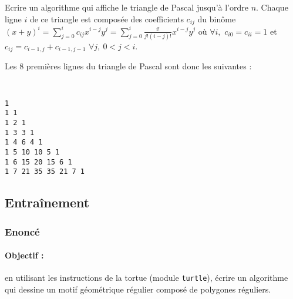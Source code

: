 \begin{question} Ecrire un algorithme qui affiche le triangle de Pascal jusqu'à l'ordre $n$. 
Chaque ligne $i$ de ce triangle est composée des coefficients $c_{ij}$ du binôme 
$\displaystyle (x + y)^i = \sum_{j=0}^{i} c_{ij}x^{i-j}y^j = \sum_{j=0}^{i} \frac{i!}{j!(i-j)!}x^{i-j}y^j$ où $\forall i,$ $c_{i0} = c_{ii} = 1$ et $c_{ij} = c_{i-1,j} + c_{i-1,j-1}$ $\forall j,\ 0 < j < i$.

\noindent
Les 8 premières lignes du triangle de Pascal sont donc les suivantes :
\hfill\begin{minipage}[t]{4cm}\tt
\begin{Verbatim}
1
1 1
1 2 1
1 3 3 1
1 4 6 4 1
1 5 10 10 5 1
1 6 15 20 15 6 1
1 7 21 35 35 21 7 1
\end{Verbatim}
\end{minipage}	
\end{question}

%
%


\subsection{Entraînement}

\subsubsection{Enoncé}

\paragraph{Objectif :} en utilisant les instructions de la tortue \logo{}
(module \texttt{turtle}), écrire un algorithme qui dessine un motif géométrique
régulier composé de polygones réguliers.


